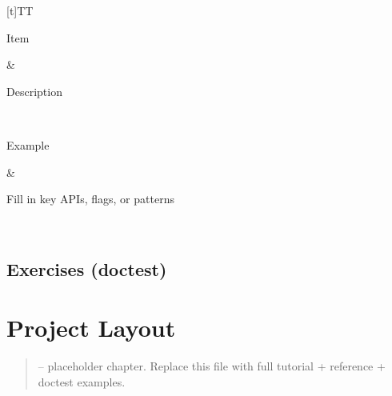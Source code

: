 \documentclass[a4paper,11pt,english]{sphinxmanual}
\begin{document}
\begin{savenotes}\sphinxattablestart
\sphinxthistablewithglobalstyle
\centering
\begin{tabulary}{\linewidth}[t]{TT}
\sphinxtoprule
\begin{varwidth}[t]{}
\sphinxstyletheadfamily \sphinxAtStartPar
Item
\sphinxbeforeendvarwidth
\end{varwidth}%
&\begin{varwidth}[t]{}
\sphinxstyletheadfamily \sphinxAtStartPar
Description
\sphinxbeforeendvarwidth
\end{varwidth}%
\\
\sphinxmidrule
\sphinxtableatstartofbodyhook\begin{varwidth}[t]{}
\sphinxAtStartPar
Example
\sphinxbeforeendvarwidth
\end{varwidth}%
&\begin{varwidth}[t]{}
\sphinxAtStartPar
Fill in key APIs, flags, or patterns
\sphinxbeforeendvarwidth
\end{varwidth}%
\\
\sphinxbottomrule
\end{tabulary}
\sphinxtableafterendhook\par
\sphinxattableend\end{savenotes}


\subsection{Exercises (doctest)}
\label{\detokenize{best_practices/pep8_formatting:exercises-doctest}}
\begin{sphinxVerbatim}[commandchars=\\\{\}]
\end{sphinxVerbatim}

\sphinxstepscope


\section{Project Layout}
\label{\detokenize{best_practices/project_layout:project-layout}}\label{\detokenize{best_practices/project_layout::doc}}\begin{quote}

\sphinxAtStartPar
{} – placeholder chapter. Replace this file with full tutorial + reference + doctest examples.
\end{quote}
\end{document}
